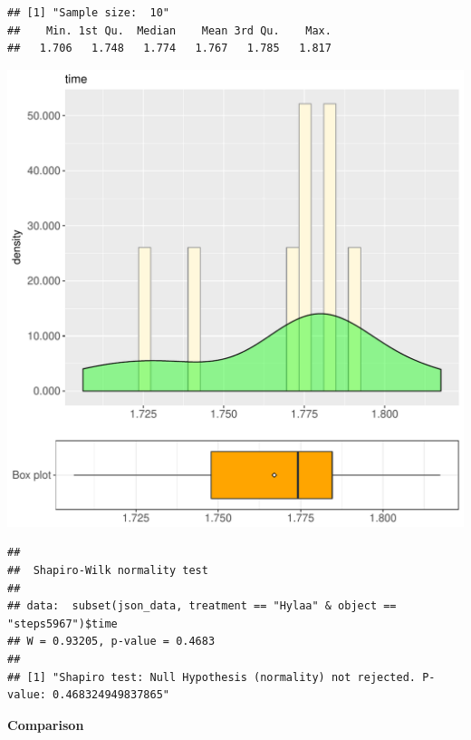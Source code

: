 \documentclass{article}\usepackage[]{graphicx}\usepackage[]{color}
\makeatletter
\def\maxwidth{ %
  \ifdim\Gin@nat@width>\linewidth
    \linewidth
  \else
    \Gin@nat@width
  \fi
}
\newenvironment{kframe}{%
 \def\at@end@of@kframe{}%
 \ifinner\ifhmode%
  \def\at@end@of@kframe{\end{minipage}}%
  \begin{minipage}{\columnwidth}%
 \fi\fi%
 \def\FrameCommand##1{\hskip\@totalleftmargin \hskip-\fboxsep
 \colorbox{shadecolor}{##1}\hskip-\fboxsep
     \hskip-\linewidth \hskip-\@totalleftmargin \hskip\columnwidth}%
 \MakeFramed {\advance\hsize-\width
   \@totalleftmargin\z@ \linewidth\hsize
   \@setminipage}}%
 {\par\unskip\endMakeFramed%
 \at@end@of@kframe}
\newenvironment{knitrout}{}{} %
\makeatother
\begin{document}
\begin{knitrout}
\color{fgcolor}\begin{kframe}
\begin{verbatim}
## [1] "Sample size:  10"
##    Min. 1st Qu.  Median    Mean 3rd Qu.    Max. 
##   1.706   1.748   1.774   1.767   1.785   1.817
\end{verbatim}
\end{kframe}
\includegraphics[width=\maxwidth]{figure/RH2_Hylaa_steps5967-1} 
\begin{kframe}\begin{verbatim}
## 
## 	Shapiro-Wilk normality test
## 
## data:  subset(json_data, treatment == "Hylaa" & object == "steps5967")$time
## W = 0.93205, p-value = 0.4683
## 
## [1] "Shapiro test: Null Hypothesis (normality) not rejected. P-value: 0.468324949837865"
\end{verbatim}
\end{kframe}
\end{knitrout}
  
 \textbf{Comparison}
  
\end{document}
